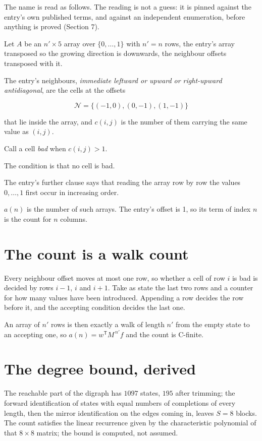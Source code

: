 \documentclass[11pt]{article}
\theoremstyle{definition}
\begin{document}
The name is read as follows. The reading is not a guess: it is pinned against the entry's own published terms, and against an independent enumeration, before anything is proved (Section 7).

Let $A$ be an $n' \times 5$ array over $\{0,\dots,1\}$ with $n' = n$ rows, the entry's array transposed so the growing direction is downwards, the neighbour offsets transposed with it.

The entry's neighbours, {\itshape immediate leftward or upward or right-upward antidiagonal}, are the cells at the offsets

\[\mathcal{N} = \{(-1,0), (0,-1), (1,-1)\}\]

that lie inside the array, and $c(i,j)$ is the number of them carrying the same value as $(i,j)$.

Call a cell {\itshape bad} when $c(i,j) > 1$.

The condition is that no cell is bad.

The entry's further clause says that reading the array row by row the values $0,\dots,1$ first occur in increasing order.

$a(n)$ is the number of such arrays. The entry's offset is 1, so its term of index $n$ is the count for $n$ columns.

\section{The count is a walk count}

Every neighbour offset moves at most one row, so whether a cell of row $i$ is bad is decided by rows $i-1$, $i$ and $i+1$. Take as state the last two rows and a counter for how many values have been introduced. Appending a row decides the row before it, and the accepting condition decides the last one.

An array of $n'$ rows is then exactly a walk of length $n'$ from the empty state to an accepting one, so $a(n) = w^{\mathsf T}M^{\,n'}f$ and the count is C-finite.

\section{The degree bound, derived}

The reachable part of the digraph has $1097$ states, $195$ after trimming; the forward identification of states with equal numbers of completions of every length, then the mirror identification on the edges coming in, leaves $S = 8$ blocks. The count satisfies the linear recurrence given by the characteristic polynomial of that $8\times8$ matrix; the bound is computed, not assumed.
\end{document}
